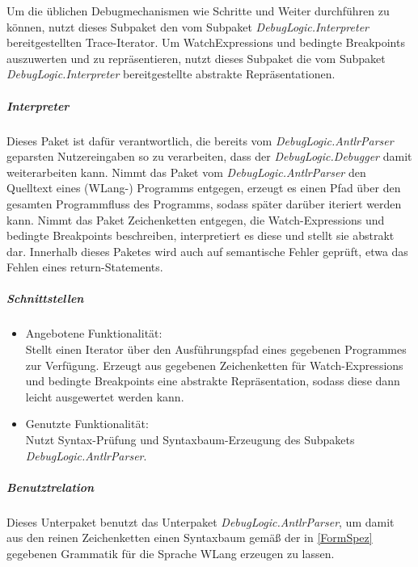 ﻿\documentclass[parskip=full]{scrartcl}
\begin{document}
Um die üblichen Debugmechanismen wie Schritte und Weiter durchführen zu können, nutzt dieses Subpaket den vom Subpaket \textit{DebugLogic.Interpreter} bereitgestellten Trace-Iterator. 
Um WatchExpressions und bedingte Breakpoints auszuwerten und zu repräsentieren, nutzt dieses Subpaket die vom Subpaket \textit{DebugLogic.Interpreter} bereitgestellte abstrakte Repräsentationen.

\subparagraph{Interpreter}
Dieses Paket ist dafür verantwortlich, die bereits vom \textit{DebugLogic.AntlrParser}  geparsten Nutzereingaben so zu verarbeiten, dass der \textit{DebugLogic.Debugger} damit weiterarbeiten kann. Nimmt das Paket vom \textit{DebugLogic.AntlrParser} den Quelltext eines (WLang-) Programms entgegen, erzeugt es einen Pfad über den gesamten Programmfluss des Programms, sodass später darüber iteriert werden kann. Nimmt das Paket Zeichenketten entgegen, die Watch-Expressions und bedingte Breakpoints beschreiben, interpretiert es diese und stellt sie abstrakt dar.
Innerhalb dieses Paketes wird auch auf semantische Fehler geprüft, etwa das Fehlen eines return-Statements.


\subparagraph{Schnittstellen}
\begin{itemize}
\item Angebotene Funktionalität:\\
Stellt einen Iterator über den Ausführungspfad eines gegebenen Programmes zur Verfügung. Erzeugt aus gegebenen Zeichenketten für Watch-Expressions und bedingte Breakpoints eine abstrakte Repräsentation, sodass diese dann leicht ausgewertet werden kann.

\item Genutzte Funktionalität:\\
Nutzt Syntax-Prüfung und Syntaxbaum-Erzeugung des Subpakets \textit{DebugLogic.AntlrParser}. 
\end{itemize}

\subparagraph{Benutztrelation} 
Dieses Unterpaket benutzt das Unterpaket \textit{DebugLogic.AntlrParser}, um damit aus den reinen Zeichenketten einen Syntaxbaum gemäß der in \ref{FormSpez} gegebenen Grammatik für die Sprache WLang erzeugen zu lassen.
\end{document}
